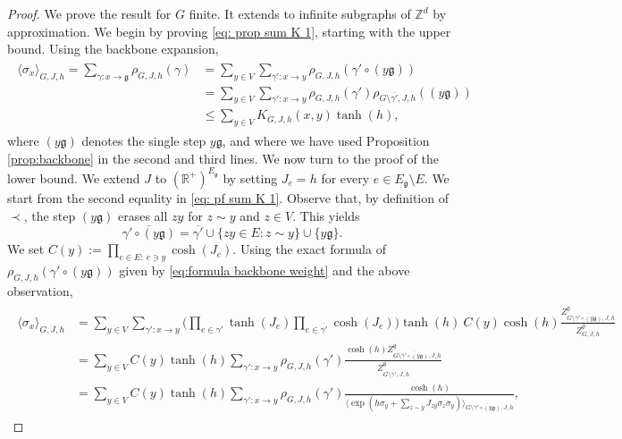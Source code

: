 \documentclass[10pt,a4paper]{amsart}
\numberwithin{equation}{section}
\newcommand\fg{\mathfrak{g}}
\begin{document}
\begin{proof} We prove the result for $G$ finite. It extends to infinite subgraphs of $\mathbb Z^d$ by approximation. We begin by proving \eqref{eq: prop sum K 1}, starting with the upper bound. Using the backbone expansion,
\begin{align}\label{eq: pf sum K 1}
\begin{aligned}
	\langle \sigma_x\rangle_{G,J,h}=\sum_{\gamma:x\rightarrow \mathfrak g}\rho_{G,J,h}(\gamma)&=\sum_{y\in V}\sum_{\gamma':x\rightarrow y}\rho_{G,J,h}(\gamma'\circ (y\fg))
	\\&=\sum_{y\in V}\sum_{\gamma':x\rightarrow y}\rho_{G,J,h}(\gamma')\rho_{G\setminus{\overline{\gamma'}},J,h}((y\fg))
	\\&\leq \sum_{y\in V}K_{G,J,h}(x,y)\tanh(h),
	\end{aligned}
\end{align}
	where $(y\fg)$ denotes the single step $y\fg$, and where we have used Proposition \ref{prop:backbone} in the second and third lines. We now turn to the proof of the lower bound. We extend $J$ to $(\mathbb R^+)^{E_\fg}$ by setting $J_e=h$ for every $e\in E_\fg\setminus E$. We start from the second equality in \eqref{eq: pf sum K 1}. Observe that, by definition of $\prec$, the step $(y\fg)$ erases all $zy$ for $z\sim y$ and $z\in V$. This yields
	\begin{equation}
		\overline{\gamma'\circ (y\fg)}=\overline{\gamma'}\cup \{zy\in E: z\sim y\} \cup \{y\fg\}.
	\end{equation}
	We set $C(y):=\prod_{e\in E: \:e\ni y} \cosh(J_e)$.
	Using the exact formula of $\rho_{G,J,h}(\gamma'\circ (y\fg))$ given by \eqref{eq:formula backbone weight} and the above observation, 
	\begin{align}\label{eq: pf sum K 2}
		\begin{aligned}
			\langle \sigma_x\rangle_{G,J,h}&=\sum_{y\in V}\sum_{\gamma':x\rightarrow y}\Big(\prod_{e\in \gamma'}\tanh(J_e) \prod_{e\in \overline{\gamma'}}\cosh(J_e)\Big) \tanh(h) \:C(y)\cosh(h) \frac{Z^\emptyset_{G\setminus \overline{\gamma'\circ (y\fg)},J,h}}{Z^\emptyset_{G,J,h}}
			\\&=\sum_{y\in V}C(y)\tanh(h)\sum_{\gamma':x\rightarrow y}\rho_{G,J,h}(\gamma')\frac{\cosh(h)Z^\emptyset_{G\setminus \overline{\gamma'\circ (y\fg)},J,h}}{Z^\emptyset_{G\setminus \overline{\gamma'},J,h}}
			\\&=\sum_{y\in V}C(y)\tanh(h)\sum_{\gamma':x\rightarrow y}\rho_{G,J,h}(\gamma')\frac{\cosh(h)}{\langle \exp(h\sigma_y+\sum_{z\sim y}J_{zy}\sigma_z\sigma_y)\rangle_{G\setminus\overline{\gamma'\circ (y\fg)},J,h}},

\end{aligned}
\end{align}
\end{proof}
\end{document}
